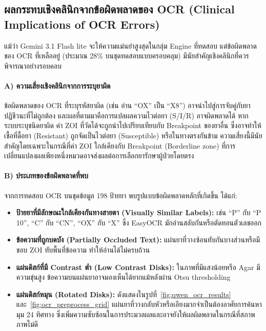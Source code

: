 \subsection{ผลกระทบเชิงคลินิกจากข้อผิดพลาดของ OCR (Clinical Implications of OCR Errors)}
\label{subsec:ocr_clinical}

แม้ว่า Gemini 3.1 Flash lite จะให้ความแม่นยำสูงสุดในกลุ่ม Engine ที่ทดสอบ แต่ข้อผิดพลาดของ OCR ที่เหลืออยู่ (ประมาณ 28\% บนชุดทดสอบแบบครอบคลุม) มีนัยสำคัญเชิงคลินิกที่ควรพิจารณาอย่างรอบคอบ

\paragraph{A) ความเสี่ยงเชิงคลินิกจากการระบุยาผิด}
ข้อผิดพลาดของ OCR ที่ระบุรหัสยาผิด (เช่น อ่าน ``OX'' เป็น ``X8'') อาจนำไปสู่การจับคู่กับยาปฏิชีวนะที่ไม่ถูกต้อง และผลที่ตามมาคือการแปลผลความไวต่อยา (S/I/R) อาจผิดพลาดได้ หากระบบระบุชนิดยาผิด ค่า ZOI ที่วัดได้จะถูกนำไปเปรียบเทียบกับ Breakpoint ของยาอื่น ซึ่งอาจทำให้เชื้อที่ดื้อยา (Resistant) ถูกจัดเป็นไวต่อยา (Susceptible) หรือในทางตรงกันข้าม ความเสี่ยงนี้มีนัยสำคัญโดยเฉพาะในกรณีที่ค่า ZOI ใกล้เคียงกับ Breakpoint (Borderline zone) ที่การเปลี่ยนแปลงผลเพียงหนึ่งหมวดอาจส่งผลต่อการเลือกยารักษาผู้ป่วยโดยตรง

\paragraph{B) ประเภทของข้อผิดพลาดที่พบ}
จากการทดสอบ OCR บนชุดข้อมูล 198 ป้ายยา พบรูปแบบข้อผิดพลาดหลักที่เกิดขึ้น ได้แก่:
\begin{itemize}
  \item \textbf{ป้ายยาที่มีลักษณะใกล้เคียงกันทางสายตา (Visually Similar Labels):} เช่น ``P'' กับ ``P 10'', ``C'' กับ ``CN'', ``OX'' กับ ``X'' ซึ่ง EasyOCR มักอ่านสลับกันหรือตัดทอนตัวเลขออก
  \item \textbf{ข้อความที่ถูกบดบัง (Partially Occluded Text):} แผ่นยาที่วางซ้อนทับกันบางส่วนหรือมีขอบ ZOI ทับพื้นที่ข้อความ ทำให้อ่านได้ไม่ครบถ้วน
  \item \textbf{แผ่นดิสก์ที่มี Contrast ต่ำ (Low Contrast Disks):} ในภาพที่มีแสงน้อยหรือ Agar มีความขุ่นสูง ข้อความบนแผ่นยาอาจมองเห็นได้ยากแม้หลังผ่าน Otsu thresholding
  \item \textbf{แผ่นดิสก์หมุน (Rotated Disks):} ดังแสดงในรูปที่~\ref{fig:qwen_ocr_results} และ~\ref{fig:ocr_preprocess_grid} แผ่นยาที่วางกลับหัวหรือเอียงมากจำเป็นต้องอาศัยการค้นหามุม 24 ทิศทาง ซึ่งเพิ่มความซับซ้อนในการประมวลผลและอาจยังให้ผลผิดพลาดในกรณีที่สภาพภาพไม่ดี
\end{itemize}

